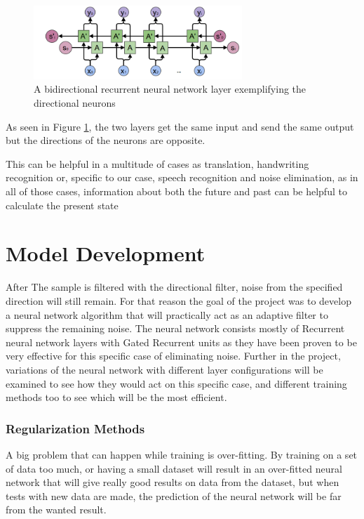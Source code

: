 \begin{figure}[htp]
	\centering
	\includegraphics[width=0.7\textwidth]{Illustrations/BRNN.png}
	\caption{A bidirectional recurrent neural network layer exemplifying the directional neurons}
	\label{fig:BRNN}
\end{figure}
As seen in Figure \ref{fig:BRNN}, the two layers get the same input and send the same output but the directions of the neurons are opposite.

This can be helpful in a multitude of cases as translation, handwriting recognition or, specific to our case, speech recognition and noise elimination, as in all of those cases, information about both the future and past can be helpful to calculate the present state 
\section{Model Development}

After The sample is filtered with the directional filter, noise from the specified direction will still remain. For that reason the goal of the project was to develop a neural network algorithm that will practically act as an adaptive filter to suppress the remaining noise. The neural network consists mostly of Recurrent neural network layers with Gated Recurrent units as they have been proven to be very effective for this specific case of eliminating noise. Further in the project, variations of the neural network with different layer configurations will be examined to see how they would act on this specific case, and different training methods too to see which will be the most efficient.

\subsubsection{Regularization Methods}
A big problem that can happen while training is over-fitting. By training on a set of data too much, or having a small dataset will result in an over-fitted neural network that will give really good results on data from the dataset, but when tests with new data are made, the prediction of the neural network will be far from the wanted result.


